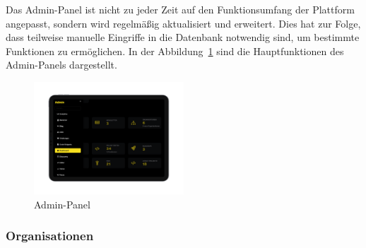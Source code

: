 \documentclass[main.tex]{subfiles}
\begin{document}
    Das Admin-Panel ist nicht zu jeder Zeit auf den Funktionsumfang der Plattform angepasst, sondern wird regelmäßig aktualisiert und erweitert.
    Dies hat zur Folge, dass teilweise manuelle Eingriffe in die Datenbank notwendig sind, um bestimmte Funktionen zu ermöglichen.
    In der Abbildung~\ref{fig:admin-panel} sind die Hauptfunktionen des Admin-Panels dargestellt.
    \begin{figure}[h]
        \centering
        \includegraphics[width=0.5\textwidth]{assets/admin-panel}
        \caption{Admin-Panel}
        \label{fig:admin-panel}
    \end{figure}
    \subsubsection{Organisationen}
\end{document}
